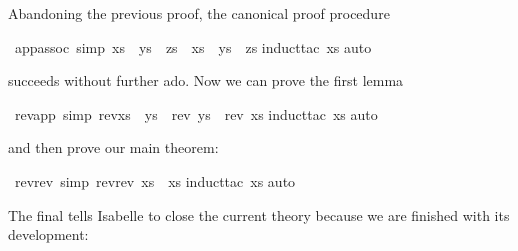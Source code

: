 \begin{isabellebody}
{}
%
\begin{isamarkuptext}%
Abandoning the previous proof, the canonical proof procedure%
\end{isamarkuptext}%
\ app{\isacharunderscore}assoc\ {\isacharbrackleft}simp{\isacharbrackright}{\isacharcolon}\ {\isachardoublequote}{\isacharparenleft}xs\ {\isacharat}\ ys{\isacharparenright}\ {\isacharat}\ zs\ {\isacharequal}\ xs\ {\isacharat}\ {\isacharparenleft}ys\ {\isacharat}\ zs{\isacharparenright}{\isachardoublequote}\isanewline
{}induct{\isacharunderscore}tac\ xs{\isacharparenright}\isanewline
{}auto{\isacharparenright}\isanewline
{}%
\begin{isamarkuptext}%
\noindent
succeeds without further ado.
Now we can prove the first lemma%
\end{isamarkuptext}%
\ rev{\isacharunderscore}app\ {\isacharbrackleft}simp{\isacharbrackright}{\isacharcolon}\ {\isachardoublequote}rev{\isacharparenleft}xs\ {\isacharat}\ ys{\isacharparenright}\ {\isacharequal}\ {\isacharparenleft}rev\ ys{\isacharparenright}\ {\isacharat}\ {\isacharparenleft}rev\ xs{\isacharparenright}{\isachardoublequote}\isanewline
{}induct{\isacharunderscore}tac\ xs{\isacharparenright}\isanewline
{}auto{\isacharparenright}\isanewline
{}%
\begin{isamarkuptext}%
\noindent
and then prove our main theorem:%
\end{isamarkuptext}%
\ rev{\isacharunderscore}rev\ {\isacharbrackleft}simp{\isacharbrackright}{\isacharcolon}\ {\isachardoublequote}rev{\isacharparenleft}rev\ xs{\isacharparenright}\ {\isacharequal}\ xs{\isachardoublequote}\isanewline
{}induct{\isacharunderscore}tac\ xs{\isacharparenright}\isanewline
{}auto{\isacharparenright}\isanewline
{}%
\begin{isamarkuptext}%
\noindent
The final  tells Isabelle to close the current theory because
we are finished with its development:%
\end{isamarkuptext}%
\isanewline
\end{isabellebody}%
